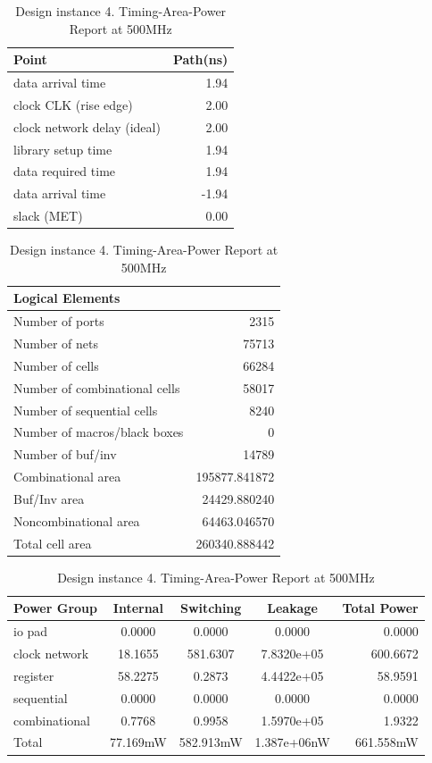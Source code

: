 \documentclass[journal,comsoc]{IEEEtran}
\begin{document}
\begin{table}[t!]
	\vspace*{-0.7mm}
	\centering
	\caption{Design instance 4. Timing-Area-Power Report at 500MHz}	
	\label{tab:reporte5} 		
	\begin{tabular}{@{}lr@{}}
		Point 						& Path(ns)\\
		\hline\hline
		data arrival time   		&1.94\\ 
		clock CLK (rise edge)  		&2.00\\
		clock network delay (ideal) &2.00\\
		library setup time			&1.94\\
		\hline
		data required time			&1.94\\
		data arrival time           &-1.94\\
		\hline
		slack (MET)                 &0.00\\	
		\hline
	\end{tabular}
	
	\begin{tabular}{@{}lr@{}}\\
		Logical Elements\\
		\hline\hline
		Number of ports                &2315\\
		Number of nets                 &75713\\
		Number of cells                &66284\\
		Number of combinational cells  &58017\\
		Number of sequential cells     &8240\\
		Number of macros/black boxes   &0\\
		Number of buf/inv              &14789\\
		\hline
		Combinational area             &195877.841872\\
		Buf/Inv area                   &24429.880240\\
		Noncombinational area          &64463.046570\\
		\hline
		Total cell area                &260340.888442\\	
		\hline
	\end{tabular}

	\begin{tabular}{@{}lcccr@{}}\\
		Power Group		 &Internal 	&Switching 	&Leakage		&Total Power\\
		\hline\hline
		io pad           &0.0000    &0.0000     &0.0000    		&0.0000\\
		clock network    &18.1655   &581.6307   &7.8320e+05 	&600.6672\\
		register         &58.2275   &0.2873     &4.4422e+05 	&58.9591\\  
		sequential       &0.0000    &0.0000     &0.0000     	&0.0000\\  
		combinational    &0.7768    &0.9958     &1.5970e+05 	&1.9322\\ 
		\hline
		Total            &77.169mW  &582.913mW  &1.387e+06nW	&661.558mW\\	
		\hline
	\end{tabular}
\end{table}
\end{document}
